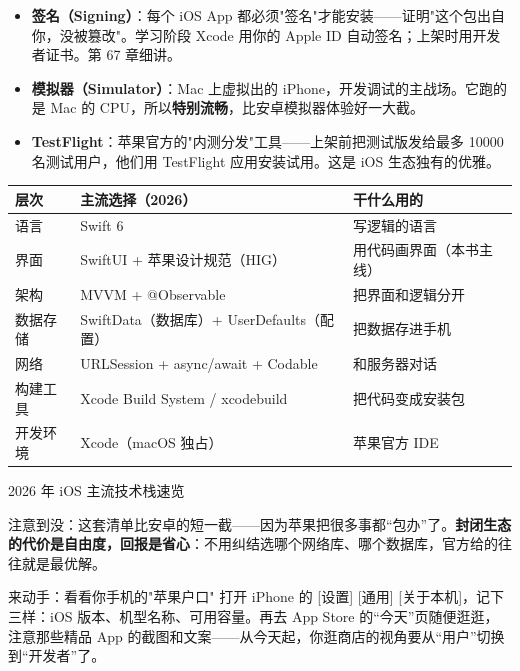 \begin{itemize}
  \item \textbf{签名（Signing）}：每个 iOS App 都必须"签名"才能安装——证明"这个包出自你，没被篡改"。学习阶段 Xcode 用你的 Apple ID 自动签名；上架时用开发者证书。第 67 章细讲。
  \item \textbf{模拟器（Simulator）}：Mac 上虚拟出的 iPhone，开发调试的主战场。它跑的是 Mac 的 CPU，所以\textbf{特别流畅}，比安卓模拟器体验好一大截。
  \item \textbf{TestFlight}：苹果官方的"内测分发"工具——上架前把测试版发给最多 10000 名测试用户，他们用 TestFlight 应用安装试用。这是 iOS 生态独有的优雅。
\end{itemize}


\begin{center}
\begin{tabularx}{\linewidth}{|X|X|X|}
\hline
\textbf{层次} & \textbf{主流选择（2026）} & \textbf{干什么用的} \tabularnewline
\hline
语言 & Swift 6 & 写逻辑的语言 \tabularnewline
界面 & SwiftUI + 苹果设计规范（HIG） & 用代码画界面（本书主线） \tabularnewline
架构 & MVVM + @Observable & 把界面和逻辑分开 \tabularnewline
数据存储 & SwiftData（数据库）+ UserDefaults（配置） & 把数据存进手机 \tabularnewline
网络 & URLSession + async/await + Codable & 和服务器对话 \tabularnewline
构建工具 & Xcode Build System / xcodebuild & 把代码变成安装包 \tabularnewline
开发环境 & Xcode（macOS 独占） & 苹果官方 IDE \tabularnewline
\hline
\end{tabularx}
\end{center}

\begin{center}\small\color{gray}2026 年 iOS 主流技术栈速览\end{center}

注意到没：这套清单比安卓的短一截——因为苹果把很多事都“包办”了。\textbf{封闭生态的代价是自由度，回报是省心}：不用纠结选哪个网络库、哪个数据库，官方给的往往就是最优解。

\begin{tcbpractice}{来动手：看看你手机的"苹果户口"}
打开 iPhone 的 [设置] [通用] [关于本机]，记下三样：iOS 版本、机型名称、可用容量。再去 App Store 的“今天”页随便逛逛，注意那些精品 App 的截图和文案——从今天起，你逛商店的视角要从“用户”切换到“开发者”了。

\end{tcbpractice}

